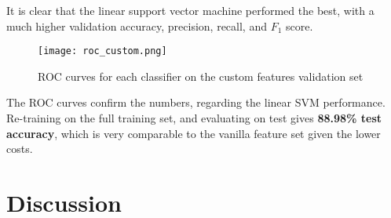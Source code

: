 \documentclass{article} %
\begin{document}
It is clear that the linear support vector machine performed the best, with a much higher validation accuracy, precision, recall, and $F_1$ score.
\begin{figure}[ht]
\centering
\texttt{[image: roc\_custom.png]}
\caption{ROC curves for each classifier on the custom features validation set}
\end{figure}
The ROC curves confirm the numbers, regarding the linear SVM performance.  Re-training on the full training set, and evaluating on test gives \textbf{88.98\% test accuracy}, which is very comparable to the vanilla feature set given the lower costs.
\section{Discussion}
\end{document}
